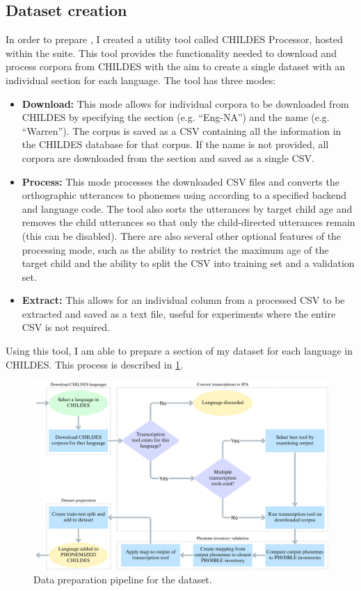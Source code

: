 \subsection{Dataset creation}
\label{sec:dataset-phonemized-childes-creation}

In order to prepare \phonemizedchildes, I created a utility tool called CHILDES Processor, hosted within the \corpusphonemizer suite. This tool provides the functionality needed to download and process corpora from CHILDES with the aim to create a single dataset with an individual section for each language. The tool has three modes:
\begin{itemize}
\item \textbf{Download:} This mode allows for individual corpora to be downloaded from CHILDES by specifying the section (e.g. ``Eng-NA'') and the name (e.g. ``Warren''). The corpus is saved as a CSV containing all the information in the CHILDES database for that corpus. If the name is not provided, all corpora are downloaded from the section and saved as a single CSV.
\item\textbf{Process:} This mode processes the downloaded CSV files and converts the orthographic utterances to phonemes using \corpusphonemizer according to a specified backend and language code. The tool also sorts the utterances by target child age and removes the child utterances so that only the child-directed utterances remain (this can be disabled). There are also several other optional features of the processing mode, such as the ability to restrict the maximum age of the target child and the ability to split the CSV into training set and a validation set.
\item\textbf{Extract:} This allows for an individual column from a processed CSV to be extracted and saved as a text file, useful for experiments where the entire CSV is not required.
\end{itemize}

Using this tool, I am able to prepare a section of my dataset for each language in CHILDES. This process is described in \cref{fig:dataset-phonemized-childes-prep}.

\begin{figure}[ht]
    \centering
    \includegraphics[width=0.9\linewidth]{Figures/13Dataset/data-prep.png}
    \caption{Data preparation pipeline for the \phonemizedchildes dataset.}
    \label{fig:dataset-phonemized-childes-prep}
\end{figure}

